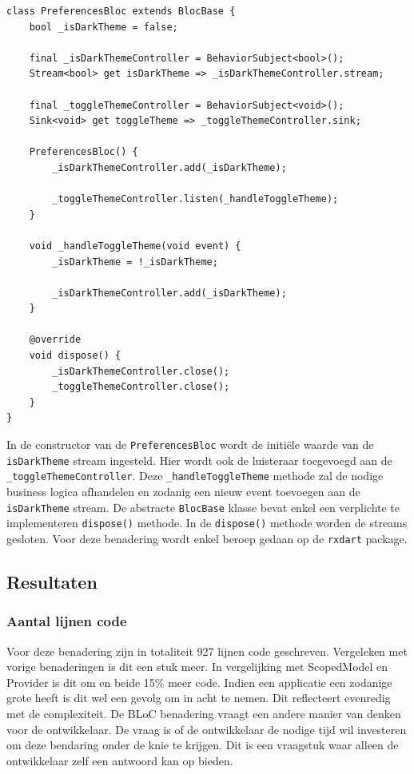 \begin{verbatim}
class PreferencesBloc extends BlocBase {
    bool _isDarkTheme = false;
    
    final _isDarkThemeController = BehaviorSubject<bool>();
    Stream<bool> get isDarkTheme => _isDarkThemeController.stream;
    
    final _toggleThemeController = BehaviorSubject<void>();
    Sink<void> get toggleTheme => _toggleThemeController.sink;
    
    PreferencesBloc() {
        _isDarkThemeController.add(_isDarkTheme);
    
        _toggleThemeController.listen(_handleToggleTheme);
    }
    
    void _handleToggleTheme(void event) {
        _isDarkTheme = !_isDarkTheme;
    
        _isDarkThemeController.add(_isDarkTheme);
    }
    
    @override
    void dispose() {
        _isDarkThemeController.close();
        _toggleThemeController.close();
    }
}
\end{verbatim}
In de constructor van de \verb|PreferencesBloc| wordt de initiële waarde van de \verb|isDarkTheme| stream ingesteld. Hier wordt ook de luisteraar toegevoegd aan de \verb|_toggleThemeController|. Deze \verb|_handleToggleTheme| methode zal de nodige business logica afhandelen en zodanig een nieuw event toevoegen aan de \verb|isDarkTheme| stream.
De abstracte \verb|BlocBase| klasse bevat enkel een verplichte te implementeren \verb|dispose()| methode. In de \verb|dispose()| methode worden de streams gesloten. \newline \newline
Voor deze benadering wordt enkel beroep gedaan op de \verb|rxdart| package. 

\subsection{Resultaten}
\subsubsection{Aantal lijnen code}
Voor deze benadering zijn in totaliteit 927 lijnen code geschreven. Vergeleken met vorige benaderingen is dit een stuk meer. In vergelijking met ScopedModel en Provider is dit om en beide 15\% meer code. Indien een applicatie een zodanige grote heeft is dit wel een gevolg om in acht te nemen. Dit reflecteert evenredig met de complexiteit. De BLoC benadering vraagt een andere manier van denken voor de ontwikkelaar. De vraag is of de ontwikkelaar de nodige tijd wil investeren om deze bendaring onder de knie te krijgen. Dit is een vraagstuk waar alleen de ontwikkelaar zelf een antwoord kan op bieden.

